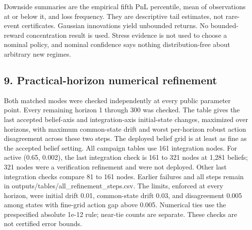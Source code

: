 \documentclass[
  10pt,
  a4paper,
]{article}
\begin{document}
Downside summaries are the empirical fifth PnL percentile, mean of
observations at or below it, and loss frequency. They are descriptive
tail estimates, not rare-event certificates. Gaussian innovations yield
unbounded returns. No bounded-reward concentration result is used.
Stress evidence is not used to choose a nominal policy, and nominal
confidence says nothing distribution-free about arbitrary new regimes.

\subsection{9. Practical-horizon numerical
refinement}\label{practical-horizon-numerical-refinement}

Both matched modes were checked independently at every public parameter
point. Every remaining horizon 1 through 300 was checked. The table
gives the last accepted belief-axis and integration-axis initial-state
changes, maximized over horizons, with maximum common-state drift and
worst per-horizon robust action disagreement across these two steps. The
deployed belief grid is at least as fine as the accepted belief setting.
All campaign tables use 161 integration nodes. For active (0.65, 0.002),
the last integration check is 161 to 321 nodes at 1,281 beliefs; 321
nodes were a verification refinement and were not deployed. Other last
integration checks compare 81 to 161 nodes. Earlier failures and all
steps remain in outputs/tables/all\_refinement\_steps.csv. The limits,
enforced at every horizon, were initial drift 0.01, common-state drift
0.03, and disagreement 0.005 among states with fine-grid action gap
above 0.005. Numerical ties use the prespecified absolute 1e-12 rule;
near-tie counts are separate. These checks are not certified error
bounds.
\end{document}
